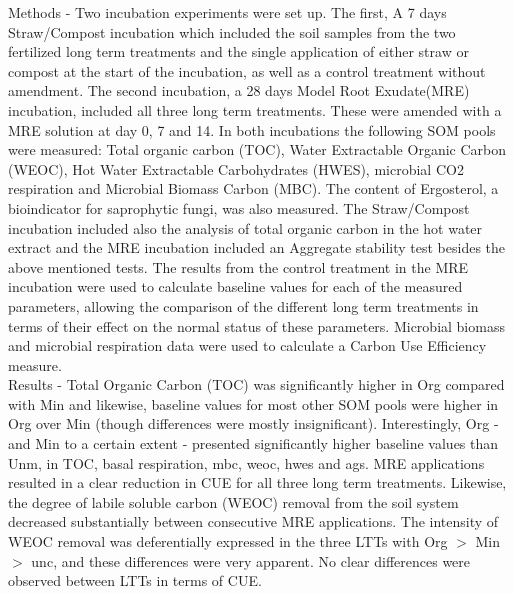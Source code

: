 	Methods - Two incubation experiments were set up. The first, A 7 days Straw/Compost incubation which included the soil samples from the two fertilized long term treatments and the single application of either straw or compost at the start of the incubation, as well as a control treatment without amendment. The second incubation, a 28 days Model Root Exudate(MRE) incubation, included all three long term treatments. These were amended with a MRE solution at day 0, 7 and 14. In both incubations the following SOM pools were measured: Total organic carbon (TOC), Water Extractable Organic Carbon (WEOC), Hot Water Extractable Carbohydrates (HWES), microbial CO2 respiration and Microbial Biomass Carbon (MBC). The content of Ergosterol, a bioindicator for saprophytic fungi, was also measured. The Straw/Compost incubation included also the analysis of total organic carbon in the hot water extract and the MRE incubation included an Aggregate stability test besides the above mentioned tests.  The results from the control treatment in the MRE incubation were used to calculate baseline values for each of the measured parameters, allowing the comparison of the different long term treatments in terms of their effect on the normal status of these parameters. Microbial biomass and microbial respiration data were used to calculate a Carbon Use Efficiency measure.\\

	Results - Total Organic Carbon (TOC) was significantly higher in Org compared with Min and likewise, baseline values  for most other SOM pools were higher in Org over Min (though differences were mostly insignificant). Interestingly, Org - and Min to a certain extent - presented significantly higher baseline values than Unm, in TOC, basal respiration, \gls{mbc}, \gls{weoc}, \gls{hwes} and \gls{ags}. 
	MRE applications resulted in a clear reduction in CUE for all three long term treatments. Likewise, the degree of labile soluble carbon (WEOC) removal from the soil system decreased substantially between consecutive MRE applications. The intensity of WEOC removal was deferentially expressed in the three LTTs with Org $  > $ Min $ > $ \gls{unc}, and these differences were very apparent. No clear differences were observed between LTTs in terms of CUE.\\

